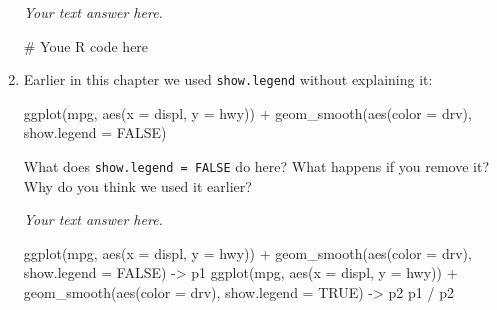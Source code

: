\documentclass[
  letterpaper,
  DIV=11,
  numbers=noendperiod]{scrreprt}
\newenvironment{Shaded}{\begin{snugshade}}{\end{snugshade}}
\newcommand{\AttributeTok}[1]{\textcolor[rgb]{0.40,0.45,0.13}{#1}}
\newcommand{\CommentTok}[1]{\textcolor[rgb]{0.37,0.37,0.37}{#1}}
\newcommand{\ConstantTok}[1]{\textcolor[rgb]{0.56,0.35,0.01}{#1}}
\newcommand{\FunctionTok}[1]{\textcolor[rgb]{0.28,0.35,0.67}{#1}}
\newcommand{\NormalTok}[1]{\textcolor[rgb]{0.00,0.23,0.31}{#1}}
\newcommand{\OtherTok}[1]{\textcolor[rgb]{0.00,0.23,0.31}{#1}}
\newcommand{\SpecialCharTok}[1]{\textcolor[rgb]{0.37,0.37,0.37}{#1}}
\begin{document}
\begin{enumerate}
\begin{tcolorbox}
  \emph{Your text answer here.}

\begin{Shaded}
\begin{Highlighting}[]
\CommentTok{\# Youe R code here}
\end{Highlighting}
\end{Shaded}

  \end{tcolorbox}
\item
  Earlier in this chapter we used \texttt{show.legend} without
  explaining it:

\begin{Shaded}
\begin{Highlighting}[]
\FunctionTok{ggplot}\NormalTok{(mpg, }\FunctionTok{aes}\NormalTok{(}\AttributeTok{x =}\NormalTok{ displ, }\AttributeTok{y =}\NormalTok{ hwy)) }\SpecialCharTok{+}
  \FunctionTok{geom\_smooth}\NormalTok{(}\FunctionTok{aes}\NormalTok{(}\AttributeTok{color =}\NormalTok{ drv), }\AttributeTok{show.legend =} \ConstantTok{FALSE}\NormalTok{)}
\end{Highlighting}
\end{Shaded}

  What does \texttt{show.legend\ =\ FALSE} do here? What happens if you
  remove it? Why do you think we used it earlier?

  \begin{tcolorbox}[enhanced jigsaw, left=2mm, rightrule=.15mm, bottomtitle=1mm, opacitybacktitle=0.6, leftrule=.75mm, opacityback=0, colframe=quarto-callout-note-color-frame, bottomrule=.15mm, coltitle=black, toptitle=1mm, colback=white, titlerule=0mm, colbacktitle=quarto-callout-note-color!10!white, title={Answer}, toprule=.15mm, breakable, arc=.35mm]

  \emph{Your text answer here.}

\begin{Shaded}
\begin{Highlighting}[]
\FunctionTok{ggplot}\NormalTok{(mpg, }\FunctionTok{aes}\NormalTok{(}\AttributeTok{x =}\NormalTok{ displ, }\AttributeTok{y =}\NormalTok{ hwy)) }\SpecialCharTok{+}
  \FunctionTok{geom\_smooth}\NormalTok{(}\FunctionTok{aes}\NormalTok{(}\AttributeTok{color =}\NormalTok{ drv), }\AttributeTok{show.legend =} \ConstantTok{FALSE}\NormalTok{) }\OtherTok{{-}\textgreater{}}\NormalTok{ p1}
\FunctionTok{ggplot}\NormalTok{(mpg, }\FunctionTok{aes}\NormalTok{(}\AttributeTok{x =}\NormalTok{ displ, }\AttributeTok{y =}\NormalTok{ hwy)) }\SpecialCharTok{+}
  \FunctionTok{geom\_smooth}\NormalTok{(}\FunctionTok{aes}\NormalTok{(}\AttributeTok{color =}\NormalTok{ drv), }\AttributeTok{show.legend =} \ConstantTok{TRUE}\NormalTok{) }\OtherTok{{-}\textgreater{}}\NormalTok{ p2}
\NormalTok{p1 }\SpecialCharTok{/}\NormalTok{ p2}
\end{Highlighting}
\end{Shaded}


\end{tcolorbox}
\end{enumerate}
\end{document}
